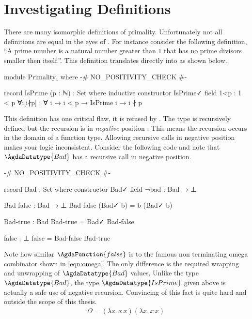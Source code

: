 \documentclass[./Thesis.tex]{subfiles}
\begin{document}
\section{Investigating Definitions}
\label{sec:investigating-definitions}
There are many isomorphic definitions of primality. Unfortunately not all
definitions are equal in the eyes of \Agda{}. For instance consider the
following definition, ``A prime number is a natural number greater than $1$ that
has no prime divisors smaller then itself.''. This definition translates
directly into \Agda{} as shown below.
\begin{code}[hide]
  module Primality₁ where
    {-# NO_POSITIVITY_CHECK #-}
\end{code}
\begin{code}
    record IsPrime (p : ℕ) : Set where
      inductive
      constructor IsPrime✓
      field
        1<p : 1 < p
        ∀i[i∤p] : ∀ {i} → i < p → IsPrime i → i ∤ p
\end{code}
This definition has one critical flaw, it is refused by \Agda{}. The type is
recursively defined but the recursion is in \textit{negative} position
\cite{harper}. This means the recursion occurs in the domain of a function type.
Allowing recursive calls in negative position makes your logic inconsistent.
Consider the following code and note that $\AgdaDatatype{Bad}$ has a recursive
call in negative position.
\begin{code}[hide]
  {-# NO_POSITIVITY_CHECK #-}
\end{code}
\begin{code}
  record Bad : Set where
    constructor Bad✓
    field
      ¬bad : Bad → ⊥

  Bad-false : Bad → ⊥
  Bad-false (Bad✓ b) = b (Bad✓ b)

  Bad-true : Bad
  Bad-true = Bad✓ Bad-false

  false : ⊥
  false = Bad-false Bad-true
\end{code}
Note how similar $\AgdaFunction{false}$ is to the famous non terminating omega
combinator shown in \ref{eqn:omega}. The only difference is the required
wrapping and unwrapping of $\AgdaDatatype{Bad}$ values. Unlike the type
$\AgdaDatatype{Bad}$, the type $\AgdaDatatype{IsPrime}$ given above is actually a safe
use of negative recursion. Convincing \Agda{} of this fact is quite hard and
outside the scope of this thesis.
\begin{align}
  \label{eqn:omega}
  \Omega = (\lambda x. \, x \, x) (\lambda x. \, x \, x)
\end{align}
\end{document}
